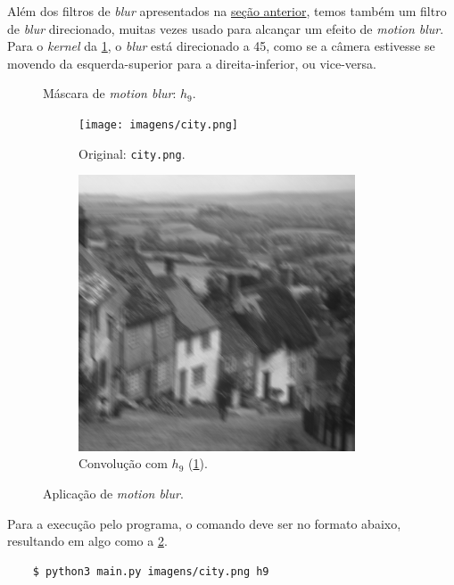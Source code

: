 
Além dos filtros de \textit{blur} apresentados na \hyperref[sec:blur]{seção anterior}, temos também um filtro de \textit{blur} direcionado, muitas vezes usado para alcançar um efeito de \textit{motion blur}. Para o \textit{kernel} da \cref{fig:h9}, o \textit{blur} está direcionado a 45\textdegree, como se a câmera estivesse se movendo da esquerda-superior para a direita-inferior, ou vice-versa.

\begin{figure}[H]
    \centering
    

    \caption{Máscara de \textit{motion blur}: $h_9$.}
    \label{fig:h9}
\end{figure}

\begin{figure}[H]
    \centering
    \begin{subfigure}{0.48\textwidth}
        \centering
        \texttt{[image: imagens/city.png]}
        \caption{Original: \texttt{city.png}.}
    \end{subfigure}%
    \begin{subfigure}{0.48\textwidth}
        \centering
        \includegraphics[width=0.9\textwidth]{resultados/city_h9.png}
        \caption{Convolução com $h_9$ (\ref{fig:h9}).}
        \label{fig:motion:conv}
    \end{subfigure}

    \caption{Aplicação de \textit{motion blur}.}
    \label{fig:motion}
\end{figure}

Para a execução pelo programa, o comando deve ser no formato abaixo, resultando em algo como a \cref{fig:motion:conv}.

\begin{verbatim}
    $ python3 main.py imagens/city.png h9
\end{verbatim}

